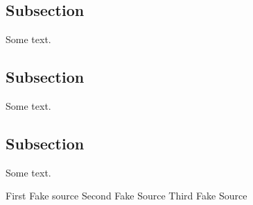 \documentclass{article}[12]
\begin{document}
	\subsection{Subsection}
	Some text.
	\subsection{Subsection}
	Some text.
	\subsection{Subsection}
	Some text.
\begin{thebibliography}{99}
		 First Fake source
		 Second Fake Source
		 Third Fake Source
\end{thebibliography}
\end{document}
